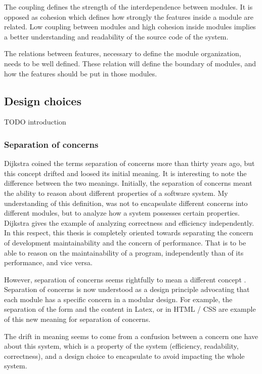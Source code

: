 The coupling defines the strength of the interdependence between modules.
It is opposed as cohesion which defines how strongly the features inside a module are related.
Low coupling between modules and high cohesion inside modules implies a better understanding and readability of the source code of the system.

The relations between features, necessary to define the module organization, needs to be well defined.
These relation will define the boundary of modules, and how the features should be put in those modules.




\subsection{Design choices}

TODO introduction

\subsubsection{Separation of concerns}

Dijkstra \cite{Dijkstra1982} coined the terms separation of concerns more than thirty years ago, but this concept drifted and loosed its initial meaning.
It is interesting to note the difference between the two meanings.
Initially, the separation of concerns meant the ability to reason about different properties of a software system.
My understanding of this definition, was not to encapsulate different concerns into different modules, but to analyze how a system possesses certain properties.
Dijkstra gives the example of analyzing correctness and efficiency independently.
In this respect, this thesis is completely oriented towards separating the concern of development maintainability and the concern of performance.
That is to be able to reason on the maintainability of a program, independently than of its performance, and vice versa.

However, separation of concerns seems rightfully to mean a different concept \cite{Tarr1999,Hursch1995}.
Separation of concerns is now understood as a design principle advocating that each module has a specific concern in a modular design.
For example, the separation of the form and the content in Latex, or in HTML / CSS are example of this new meaning for separation of concerns.

The drift in meaning seems to come from a confusion between a concern one have about this system, which is a property of the system (efficiency, readability, correctness), and a design choice to encapsulate to avoid impacting the whole system.


